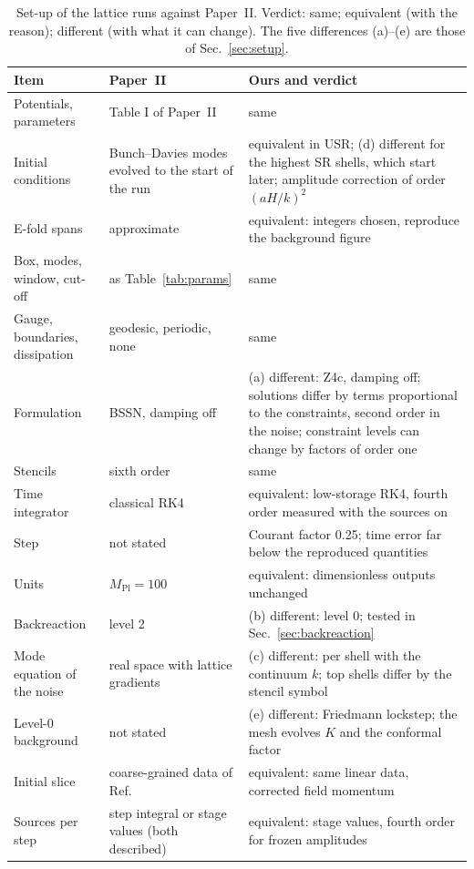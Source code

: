 \documentclass[aps,prd,twocolumn,10pt,superscriptaddress,nofootinbib,longbibliography,floatfix]{revtex4-2}
\newcommand{\Mpl}{M_\mathrm{Pl}}
\newcommand{\Ptwo}{Paper~II}
\begin{document}
\begin{table}
\caption{Set-up of the lattice runs against \Ptwo{}. Verdict: same; equivalent (with the reason); different (with what it can change). The five differences (a)--(e) are those of Sec.~\ref{sec:setup}.}
\label{tab:setup}
\footnotesize
\begin{tabular}{p{}p{}p{}}
\toprule
Item & \Ptwo{} & Ours and verdict \\
\midrule
Potentials, parameters & Table I of \Ptwo{} & same \\
Initial conditions & Bunch--Davies modes evolved to the start of the run & equivalent in USR; (d) different for the highest SR shells, which start later; amplitude correction of order $(aH/k)^2$ \\
E-fold spans & approximate & equivalent: integers chosen, reproduce the background figure \\
Box, modes, window, cut-off & as Table~\ref{tab:params} & same \\
Gauge, boundaries, dissipation & geodesic, periodic, none & same \\
Formulation & BSSN, damping off & (a) different: Z4c, damping off; solutions differ by terms proportional to the constraints, second order in the noise; constraint levels can change by factors of order one \\
Stencils & sixth order & same \\
Time integrator & classical RK4 & equivalent: low-storage RK4, fourth order measured with the sources on \\
Step & not stated & Courant factor 0.25; time error far below the reproduced quantities \\
Units & $\Mpl = 100$ & equivalent: dimensionless outputs unchanged \\
Backreaction & level 2 & (b) different: level 0; tested in Sec.~\ref{sec:backreaction} \\
Mode equation of the noise & real space with lattice gradients & (c) different: per shell with the continuum $k$; top shells differ by the stencil symbol \\
Level-0 background & not stated & (e) different: Friedmann lockstep; the mesh evolves $K$ and the conformal factor \\
Initial slice & coarse-grained data of Ref.~\cite{Launay:2025bd} & equivalent: same linear data, corrected field momentum \\
Sources per step & step integral or stage values (both described) & equivalent: stage values, fourth order for frozen amplitudes \\

\end{tabular}
\end{table}
\end{document}
